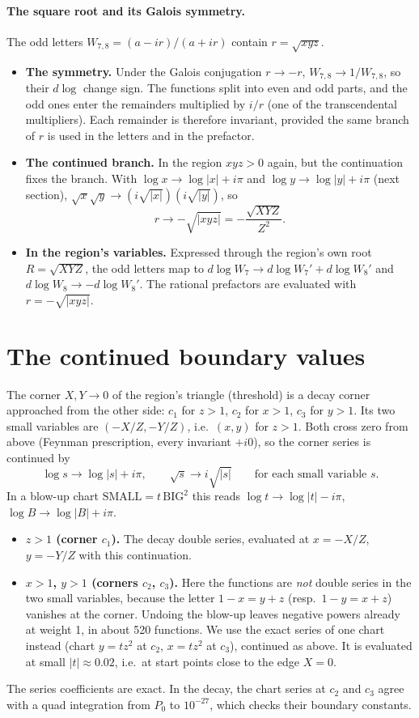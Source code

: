 \documentclass[11pt]{article}
\begin{document}
\paragraph{The square root and its Galois symmetry.} The odd letters $W_{7,8}=(a-ir)/(a+ir)$ contain $r=\sqrt{xyz}$.
\begin{itemize}
\item \textbf{The symmetry.} Under the Galois conjugation $r\to-r$, $W_{7,8}\to1/W_{7,8}$, so their $d\log$ change sign.
  The functions split into even and odd parts, and the odd ones enter the remainders multiplied by $i/r$ (one of the
  transcendental multipliers). Each remainder is therefore invariant, provided the same branch of $r$ is used in the
  letters and in the prefactor.
\item \textbf{The continued branch.} In the region $xyz>0$ again, but the continuation fixes the branch. With
  $\log x\to\log|x|+i\pi$ and $\log y\to\log|y|+i\pi$ (next section), $\sqrt x\sqrt y\to(i\sqrt{|x|})(i\sqrt{|y|})$, so
  \[
    r\to-\sqrt{|xyz|}=-\frac{\sqrt{XYZ}}{Z^2}.
  \]
\item \textbf{In the region's variables.} Expressed through the region's own root $R=\sqrt{XYZ}$, the odd letters map
  to $d\log W_7\to d\log W_7'+d\log W_8'$ and $d\log W_8\to-d\log W_8'$. The rational prefactors are evaluated with
  $r=-\sqrt{|xyz|}$.
\end{itemize}

\section{The continued boundary values}
The corner $X,Y\to0$ of the region's triangle (threshold) is a decay corner approached from the other side: $c_1$ for
$z>1$, $c_2$ for $x>1$, $c_3$ for $y>1$. Its two small variables are $(-X/Z,-Y/Z)$, i.e.\ $(x,y)$ for $z>1$. Both cross
zero from above (Feynman prescription, every invariant $+i0$), so the corner series is continued by
\[
  \log s\to\log|s|+i\pi,\qquad \sqrt s\to i\sqrt{|s|}\qquad\text{for each small variable }s .
\]
In a blow-up chart $\text{SMALL}=t\,\text{BIG}^2$ this reads $\log t\to\log|t|-i\pi$, $\log B\to\log|B|+i\pi$.
\begin{itemize}
\item \textbf{$z>1$ (corner $c_1$).} The decay double series, evaluated at $x=-X/Z$, $y=-Y/Z$ with this continuation.
\item \textbf{$x>1$, $y>1$ (corners $c_2$, $c_3$).} Here the functions are \emph{not} double series in the two small
  variables, because the letter $1-x=y+z$ (resp.\ $1-y=x+z$) vanishes at the corner. Undoing the blow-up leaves
  negative powers already at weight 1, in about 520 functions. We use the exact series of one chart instead (chart
  $y=tz^2$ at $c_2$, $x=tz^2$ at $c_3$), continued as above. It is evaluated at small $|t|\approx0.02$, i.e.\ at start
  points close to the edge $X=0$.
\end{itemize}
The series coefficients are exact. In the decay, the chart series at $c_2$ and $c_3$ agree with a quad integration from
$P_0$ to $10^{-27}$, which checks their boundary constants.
\end{document}
